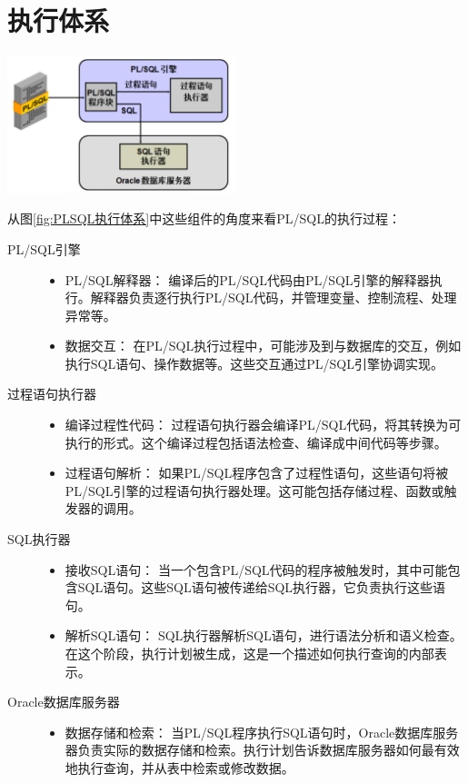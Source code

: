 \documentclass[11pt, a4paper, oneside, UTF8]{ctexbook}
\begin{document}
\section{执行体系}
\begin{center}
  \begin{minipage}{\textwidth}
    \center
    \includegraphics[width=0.5\textwidth]{picture/PLSQL执行体系.png}
    \captionsetup{hypcap=false}
    \label{fig:PLSQL执行体系}
  \end{minipage}
\end{center}
从图\ref{fig:PLSQL执行体系}中这些组件的角度来看PL/SQL的执行过程：
\begin{description}
  \item[PL/SQL引擎] \hfill
    \begin{itemize}
      \item PL/SQL解释器： 编译后的PL/SQL代码由PL/SQL引擎的解释器执行。解释器负责逐行执行PL/SQL代码，并管理变量、控制流程、处理异常等。
      \item 数据交互： 在PL/SQL执行过程中，可能涉及到与数据库的交互，例如执行SQL语句、操作数据等。这些交互通过PL/SQL引擎协调实现。
    \end{itemize}
  \item[过程语句执行器] \hfill
    \begin{itemize}
      \item 编译过程性代码： 过程语句执行器会编译PL/SQL代码，将其转换为可执行的形式。这个编译过程包括语法检查、编译成中间代码等步骤。
      \item 过程语句解析： 如果PL/SQL程序包含了过程性语句，这些语句将被PL/SQL引擎的过程语句执行器处理。这可能包括存储过程、函数或触发器的调用。
    \end{itemize}
  \item[SQL执行器]  \hfill
    \begin{itemize}
      \item 接收SQL语句： 当一个包含PL/SQL代码的程序被触发时，其中可能包含SQL语句。这些SQL语句被传递给SQL执行器，它负责执行这些语句。
      \item 解析SQL语句： SQL执行器解析SQL语句，进行语法分析和语义检查。在这个阶段，执行计划被生成，这是一个描述如何执行查询的内部表示。
    \end{itemize}
  \item[Oracle数据库服务器] \hfill
    \begin{itemize}
      \item 数据存储和检索： 当PL/SQL程序执行SQL语句时，Oracle数据库服务器负责实际的数据存储和检索。执行计划告诉数据库服务器如何最有效地执行查询，并从表中检索或修改数据。
    \end{itemize}
\end{description}
\end{document}
